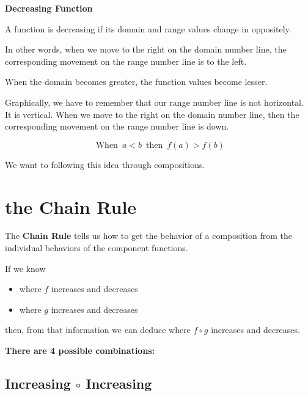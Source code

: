 \documentclass{ximera}
\begin{document}
\begin{template} \textbf{\textcolor{blue!55!black}{Decreasing Function}} 


A function is decreasing if its domain and range values change in oppositely. 


In other words, when we move to the right on the domain number line, the corresponding movement on the range number line is to the left.

When the domain becomes greater, the function values become lesser.


Graphically, we have to remember that our range number line is not horizontal.  It is vertical.  When we move to the right on the domain number line, then the corresponding movement on the range number line is down.



\[
\text{ When } \,  a < b \, \text{ then } \, f(a) > f(b)
\]


\end{template}






We want to following this idea through compositions.   


\section*{the Chain Rule}


The \textbf{Chain Rule} tells us how to get the behavior of a composition from the individual behaviors of the component functions.


If we know 

\begin{itemize}
\item where $f$ increases and decreases
\item where $g$ increases and decreases
\end{itemize}

then, from that information we can deduce where $f\circ g$ increases and decreases.





\textbf{\textcolor{blue!55!black}{There are 4 possible combinations:}} 



\subsection*{Increasing $\circ$ Increasing}
\end{document}

